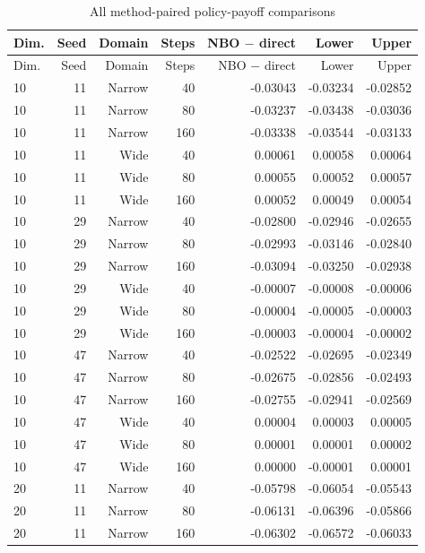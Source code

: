 \documentclass[ecta,nameyear,draft]{econsocart}
\theoremstyle{definition}
\theoremstyle{remark}
\begin{document}
\begin{small}
\begin{longtable}{lrrrrrr}
\caption{All method-paired policy-payoff comparisons}\\
\toprule
Dim. & Seed & Domain & Steps & NBO $-$ direct & Lower & Upper \\
\midrule\endfirsthead
\toprule
Dim. & Seed & Domain & Steps & NBO $-$ direct & Lower & Upper \\
\midrule\endhead
10 & 11 & Narrow & 40 & -0.03043 & -0.03234 & -0.02852 \\
10 & 11 & Narrow & 80 & -0.03237 & -0.03438 & -0.03036 \\
10 & 11 & Narrow & 160 & -0.03338 & -0.03544 & -0.03133 \\
10 & 11 & Wide & 40 & 0.00061 & 0.00058 & 0.00064 \\
10 & 11 & Wide & 80 & 0.00055 & 0.00052 & 0.00057 \\
10 & 11 & Wide & 160 & 0.00052 & 0.00049 & 0.00054 \\
10 & 29 & Narrow & 40 & -0.02800 & -0.02946 & -0.02655 \\
10 & 29 & Narrow & 80 & -0.02993 & -0.03146 & -0.02840 \\
10 & 29 & Narrow & 160 & -0.03094 & -0.03250 & -0.02938 \\
10 & 29 & Wide & 40 & -0.00007 & -0.00008 & -0.00006 \\
10 & 29 & Wide & 80 & -0.00004 & -0.00005 & -0.00003 \\
10 & 29 & Wide & 160 & -0.00003 & -0.00004 & -0.00002 \\
10 & 47 & Narrow & 40 & -0.02522 & -0.02695 & -0.02349 \\
10 & 47 & Narrow & 80 & -0.02675 & -0.02856 & -0.02493 \\
10 & 47 & Narrow & 160 & -0.02755 & -0.02941 & -0.02569 \\
10 & 47 & Wide & 40 & 0.00004 & 0.00003 & 0.00005 \\
10 & 47 & Wide & 80 & 0.00001 & 0.00001 & 0.00002 \\
10 & 47 & Wide & 160 & 0.00000 & -0.00001 & 0.00001 \\
20 & 11 & Narrow & 40 & -0.05798 & -0.06054 & -0.05543 \\
20 & 11 & Narrow & 80 & -0.06131 & -0.06396 & -0.05866 \\
20 & 11 & Narrow & 160 & -0.06302 & -0.06572 & -0.06033 \\

\end{longtable}
\end{small}
\end{document}
